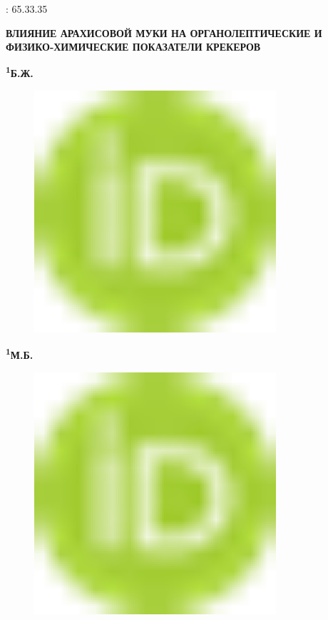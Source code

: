 : 65.33.35

{\bfseries ВЛИЯНИЕ АРАХИСОВОЙ МУКИ НА ОРГАНОЛЕПТИЧЕСКИЕ И ФИЗИКО-ХИМИЧЕСКИЕ
ПОКАЗАТЕЛИ КРЕКЕРОВ}

{\bfseries \textsuperscript{1}Б.Ж.
\begin{figure}[H]
	\centering
	\includegraphics[width=0.8\textwidth]{media/pish3/image1}
	\caption*{}
\end{figure}

{\bfseries \textsuperscript{1}М.Б.
\begin{figure}[H]
	\centering
	\includegraphics[width=0.8\textwidth]{media/pish3/image1}
	\caption*{}
\end{figure}

}}
